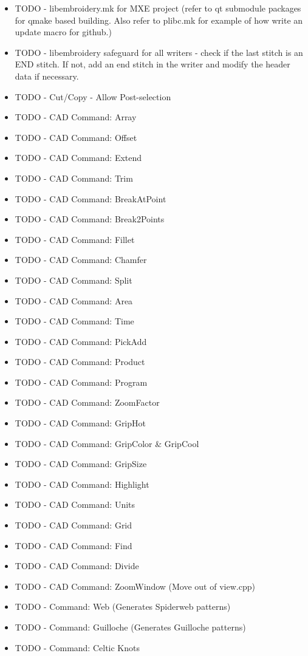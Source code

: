 \begin{itemize}
\item TODO - libembroidery.mk for MXE project (refer to qt submodule packages for qmake based building. Also refer to plibc.mk for example of how write an update macro for github.)
\item TODO - libembroidery safeguard for all writers - check if the last stitch is an END stitch. If not, add an end stitch in the writer and modify the header data if necessary.
\item TODO - Cut/Copy - Allow Post-selection
\item TODO - CAD Command: Array
\item TODO - CAD Command: Offset
\item TODO - CAD Command: Extend
\item TODO - CAD Command: Trim
\item TODO - CAD Command: BreakAtPoint
\item TODO - CAD Command: Break2Points
\item TODO - CAD Command: Fillet
\item TODO - CAD Command: Chamfer
\item TODO - CAD Command: Split
\item TODO - CAD Command: Area
\item TODO - CAD Command: Time
\item TODO - CAD Command: PickAdd
\item TODO - CAD Command: Product
\item TODO - CAD Command: Program
\item TODO - CAD Command: ZoomFactor
\item TODO - CAD Command: GripHot
\item TODO - CAD Command: GripColor \& GripCool
\item TODO - CAD Command: GripSize
\item TODO - CAD Command: Highlight
\item TODO - CAD Command: Units
\item TODO - CAD Command: Grid
\item TODO - CAD Command: Find
\item TODO - CAD Command: Divide
\item TODO - CAD Command: ZoomWindow (Move out of view.cpp)
\item TODO - Command: Web (Generates Spiderweb patterns)
\item TODO - Command: Guilloche (Generates Guilloche patterns)
\item TODO - Command: Celtic Knots

\end{itemize}
